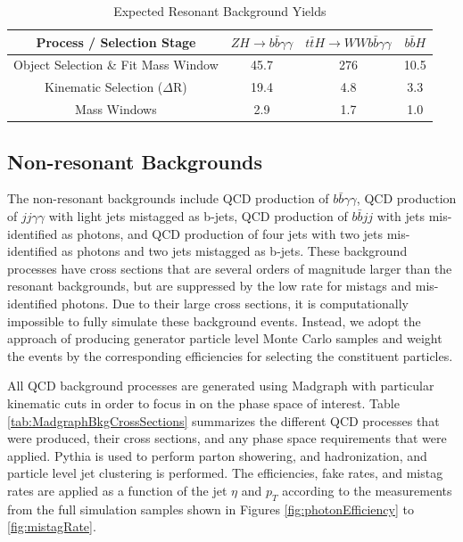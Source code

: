 \documentclass{cmspaper}
\begin{document}
\begin{table}[!ht]
\begin{center} 
\begin{tabular}{|c|c|c|c|}
\hline
Process / Selection Stage            &  $ZH \rightarrow b\bar{b}\gamma\gamma$ &  $t\bar{t}H \rightarrow W W b \bar{b}\gamma\gamma$ &  $b\bar{b}H$     \\  \hline
Object Selection \& Fit Mass Window  &  45.7                                  &  276                                               &  10.5            \\ 
Kinematic Selection ($\Delta$R)      &  19.4                                  &  4.8                                               &  3.3             \\ 
Mass Windows                         &  2.9                                   &  1.7                                               &  1.0             \\  \hline

\end{tabular}
\caption{Expected Resonant Background Yields }
\label{tab:resonantBkgEventYields}
\end{center}
\end{table}




\subsection{Non-resonant Backgrounds}
The non-resonant backgrounds include QCD production of $b \bar{b} \gamma\gamma$, QCD production
of $jj \gamma\gamma$ with light jets mistagged as b-jets, QCD production of $b \bar{b} jj$ with
jets mis-identified as photons, and QCD production of four jets with two jets mis-identified 
as photons and two jets mistagged as b-jets. These background processes have cross sections
that are several orders of magnitude larger than the resonant backgrounds, but are suppressed
by the low rate for mistags and mis-identified photons. Due to their large cross sections, 
it is computationally impossible to fully simulate these background events. Instead, we adopt the
approach of producing generator particle level Monte Carlo samples and weight the events by the
corresponding efficiencies for selecting the constituent particles.

All QCD background processes are generated using Madgraph \cite{madgraph} with particular kinematic
cuts in order to focus in on the phase space of interest. Table \ref{tab:MadgraphBkgCrossSections} 
summarizes the different QCD processes that were produced, their cross sections, 
and any phase space requirements that were applied. Pythia is used to perform parton showering,
and hadronization, and particle level jet clustering is performed. The efficiencies, fake rates, and
mistag rates are applied as a function of the jet $\eta$ and $p_{T}$ according to the measurements
from the full simulation samples shown in Figures \ref{fig:photonEfficiency} to \ref{fig:mistagRate}.
\end{document}
